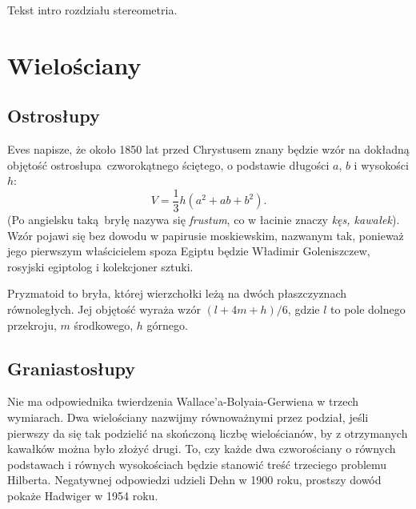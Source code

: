 
Tekst intro rozdziału stereometria.

\section{Wielościany}
\subsection{Ostrosłupy}

Eves \cite[s.4]{eves_1963} napisze, że około 1850 lat przed Chrystusem znany będzie wzór na dokładną objętość ostrosłupa czworokątnego ściętego, o podstawie długości $a$, $b$ i wysokości $h$:
\begin{equation}
	V = \frac 1 3 h (a^2 + ab + b^2).
\end{equation}
(Po angielsku taką bryłę nazywa się \emph{frustum}, co w łacinie znaczy \emph{kęs, kawałek}).
Wzór pojawi się bez dowodu w papirusie moskiewskim, nazwanym tak, ponieważ jego pierwszym właścicielem spoza Egiptu będzie Władimir Goleniszczew, rosyjski egiptolog i kolekcjoner sztuki.
%

Pryzmatoid to bryła, której wierzchołki leżą na dwóch płaszczyznach równoległych.
Jej objętość wyraża wzór $(l + 4m + h)/ 6$, gdzie $l$ to pole dolnego przekroju, $m$ środkowego, $h$ górnego. %

\subsection{Graniastosłupy}


Nie ma odpowiednika twierdzenia Wallace'a-Bolyaia-Gerwiena w trzech wymiarach.
Dwa wielościany nazwijmy równoważnymi przez podział, jeśli pierwszy da się tak podzielić na skończoną liczbę wielościanów, by z otrzymanych kawałków można było złożyć drugi.
To, czy każde dwa czworościany o równych podstawach i równych wysokościach będzie stanowić treść trzeciego problemu Hilberta.
Negatywnej odpowiedzi udzieli Dehn w 1900 roku, prostszy dowód pokaże Hadwiger w 1954 roku.

